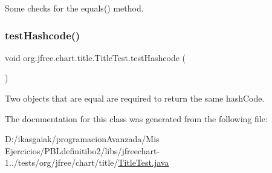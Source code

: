 Some checks for the equals() method. \mbox{\label{classorg_1_1jfree_1_1chart_1_1title_1_1_title_test_aa3fb18f99fa8b9935f4bbb48d46c89f4}} 
\subsubsection{\texorpdfstring{test\+Hashcode()}{testHashcode()}}
{\footnotesize\ttfamily void org.\+jfree.\+chart.\+title.\+Title\+Test.\+test\+Hashcode (\begin{DoxyParamCaption}{ }\end{DoxyParamCaption})}

Two objects that are equal are required to return the same hash\+Code. 

The documentation for this class was generated from the following file\+:\begin{DoxyCompactItemize}
\item 
D\+:/ikasgaiak/programacion\+Avanzada/\+Mis Ejercicios/\+P\+B\+Ldefinitibo2/libs/jfreechart-\/1../tests/org/jfree/chart/title/\mbox{\hyperlink{_title_test_8java}{Title\+Test.\+java}}\end{DoxyCompactItemize}

